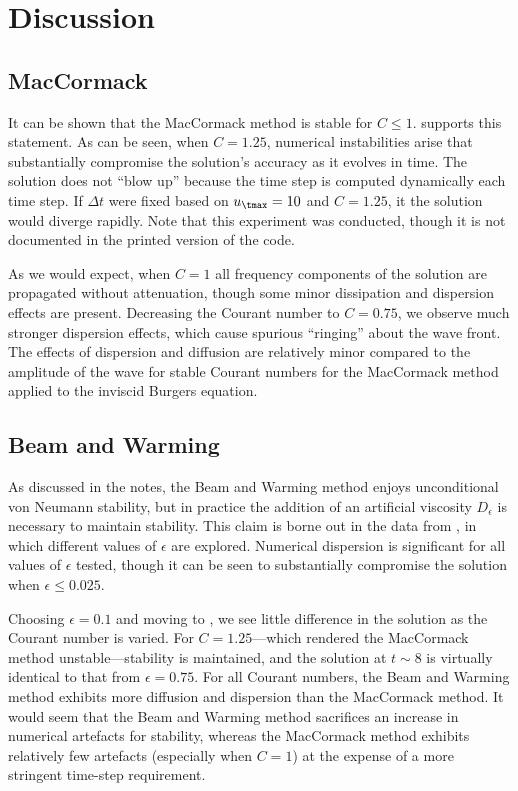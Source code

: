 \documentclass[11pt]{article}
\begin{document}
\section{Discussion} %

\subsection{MacCormack}

It can be shown that the MacCormack method is stable for $C \le 1$.  supports this statement.  As can be seen, when $C=1.25$, numerical instabilities arise that substantially compromise the solution's accuracy as it evolves in time. The solution does not ``blow up'' because the time step is computed dynamically each time step. If $\Delta t$ were fixed based on $u_\tmax = 10$ and $C=1.25$, it the solution would diverge rapidly. Note that this experiment was conducted, though it is not documented in the printed version of the code.

As we would expect, when $C=1$ all frequency components of the solution are propagated  without attenuation, though some minor dissipation and dispersion effects are present. Decreasing the Courant number to $C=0.75$, we observe much stronger dispersion effects, which cause spurious ``ringing'' about the wave front. The effects of dispersion and diffusion are relatively minor compared to the amplitude of the wave for stable Courant numbers for the MacCormack method applied to the inviscid Burgers equation.

\subsection{Beam and Warming}

As discussed in the notes, the Beam and Warming method enjoys unconditional von Neumann stability, but in practice the addition of an artificial viscosity $D_\epsilon$ is necessary to maintain stability. This claim is borne out in the data from , in which different values of $\epsilon$ are explored. Numerical dispersion is significant for all values of $\epsilon$ tested, though it can be seen to substantially compromise the solution when $\epsilon \le 0.025$.

Choosing $\epsilon=0.1$ and moving to , we see little difference in the solution as the Courant number is varied. For $C=1.25$---which rendered the MacCormack method unstable---stability is maintained, and the solution at $t \sim 8$ is virtually identical to that from $\epsilon=0.75$. For all Courant numbers, the Beam and Warming method exhibits more diffusion and dispersion than the MacCormack method. It would seem that the Beam and Warming method sacrifices an increase in numerical artefacts for stability, whereas the MacCormack method exhibits relatively few artefacts (especially when $C=1$) at the expense of a more stringent time-step requirement.
\end{document}
